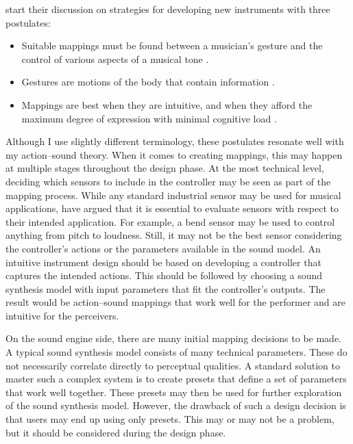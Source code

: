 \citet[p.171]{levitin_control_2002} start their discussion on strategies for developing new instruments with three postulates:

\begin{itemize}
 \item Suitable mappings must be found between a musician’s gesture and the control of various aspects of a musical tone \citep{cadoz_responsive_1984,wanderley_performer-instrument_2001}.
 \item Gestures are motions of the body that contain information \citep{kurtenbach_gestures_1990}.
 \item Mappings are best when they are intuitive, and when they afford the maximum degree of expression with minimal cognitive load \citep[e.g.][]{keele_attention_1973,mulder_mapping_1997}.
\end{itemize}

Although I use slightly different terminology, these postulates resonate well with my action--sound theory.
When it comes to creating mappings, this may happen at multiple stages throughout the design phase. At the most technical level, deciding which sensors to include in the controller may be seen as part of the mapping process. While any standard industrial sensor may be used for musical applications, \citet{kronland-martinet_evaluation_2006} have argued that it is essential to evaluate sensors with respect to their intended application. For example, a bend sensor may be used to control anything from pitch to loudness. Still, it may not be the best sensor considering the controller's actions or the parameters available in the sound model. An intuitive instrument design should be based on developing a controller that captures the intended actions. This should be followed by choosing a sound synthesis model with input parameters that fit the controller's outputs. The result would be action--sound mappings that work well for the performer and are intuitive for the perceivers.

On the sound engine side, there are many initial mapping decisions to be made. A typical sound synthesis model consists of many technical parameters. These do not necessarily correlate directly to perceptual qualities. A standard solution to master such a complex system is to create presets that define a set of parameters that work well together. These presets may then be used for further exploration of the sound synthesis model. However, the drawback of such a design decision is that users may end up using only presets. This may or may not be a problem, but it should be considered during the design phase.

